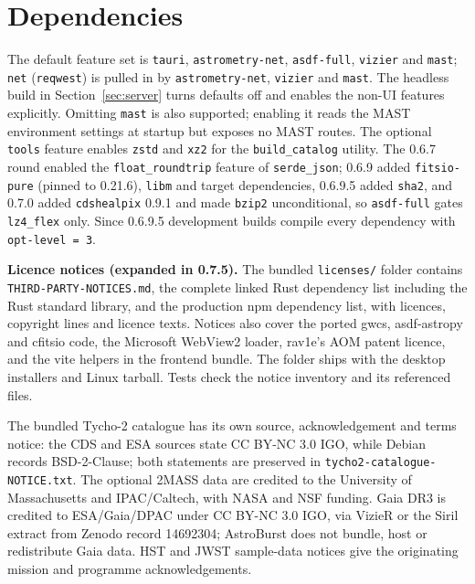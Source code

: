 \documentclass[11pt,a4paper]{article}
\newcommand{\code}[1]{\texttt{\small #1}}
\newcommand{\crate}[1]{\texttt{#1}}
\begin{document}
    \section{Dependencies}
    \label{sec:deps}


    The default feature set is \code{tauri}, \code{astrometry-net}, \code{asdf-full}, \code{vizier} and \code{mast}; \code{net} (\crate{reqwest}) is pulled in by \code{astrometry-net}, \code{vizier} and \code{mast}. The headless build in Section~\ref{sec:server} turns defaults off and enables the non-UI features explicitly. Omitting \code{mast} is also supported; enabling it reads the MAST environment settings at startup but exposes no MAST routes. The optional \code{tools} feature enables \crate{zstd} and \crate{xz2} for the \code{build\_catalog} utility. The 0.6.7 round enabled the \code{float\_roundtrip} feature of \crate{serde\_json}; 0.6.9 added \crate{fitsio-pure} (pinned to 0.21.6), \crate{libm} and target dependencies, 0.6.9.5 added \crate{sha2}, and 0.7.0 added \crate{cdshealpix} 0.9.1 and made \crate{bzip2} unconditional, so \code{asdf-full} gates \crate{lz4\_flex} only. Since 0.6.9.5 development builds compile every dependency with \code{opt-level = 3}.

    \textbf{Licence notices (expanded in 0.7.5).} The bundled \code{licenses/} folder contains \code{THIRD-PARTY-NOTICES.md}, the complete linked Rust dependency list including the Rust standard library, and the production npm dependency list, with licences, copyright lines and licence texts. Notices also cover the ported gwcs, asdf-astropy and cfitsio code, the Microsoft WebView2 loader, rav1e's AOM patent licence, and the vite helpers in the frontend bundle. The folder ships with the desktop installers and Linux tarball. Tests check the notice inventory and its referenced files.

    The bundled Tycho-2 catalogue has its own source, acknowledgement and terms notice: the CDS and ESA sources state CC BY-NC 3.0 IGO, while Debian records BSD-2-Clause; both statements are preserved in \code{tycho2-catalogue-NOTICE.txt}. The optional 2MASS data are credited to the University of Massachusetts and IPAC/Caltech, with NASA and NSF funding. Gaia DR3 is credited to ESA/Gaia/DPAC under CC BY-NC 3.0 IGO, via VizieR or the Siril extract from Zenodo record 14692304; AstroBurst does not bundle, host or redistribute Gaia data. HST and JWST sample-data notices give the originating mission and programme acknowledgements.
\end{document}
